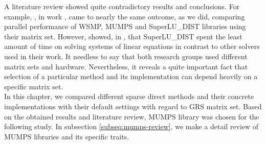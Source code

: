 A literature review showed quite contradictory results and conclusions. For example, \citeauthor{wsmp}, in work \cite{wsmp}, came to nearly the same outcome, as we did, comparing parallel performance of WSMP, MUMPS and SuperLU\_DIST libraries using their matrix set. However, \citeauthor{mm-comparison-of-packages} showed, in \cite{mm-comparison-of-packages}, that SuperLU\_DIST spent the least amount of time on solving  systems of linear equations in contrast to other solvers used in their work. It needless to say that both research groups used different matrix sets and hardware. Nevertheless, it reveals a quite important fact that selection of a particular method and its implementation can depend heavily on a specific matrix set.\\


In this chapter, we compared different sparse direct methods and their concrete implementations with their default settings with regard to GRS matrix set. Based on the obtained results and literature review, MUMPS library was chosen for the following study. In subsection \ref{subseq:mumps-review}, we make a detail review of MUMPS libraries and its specific traits. \\
